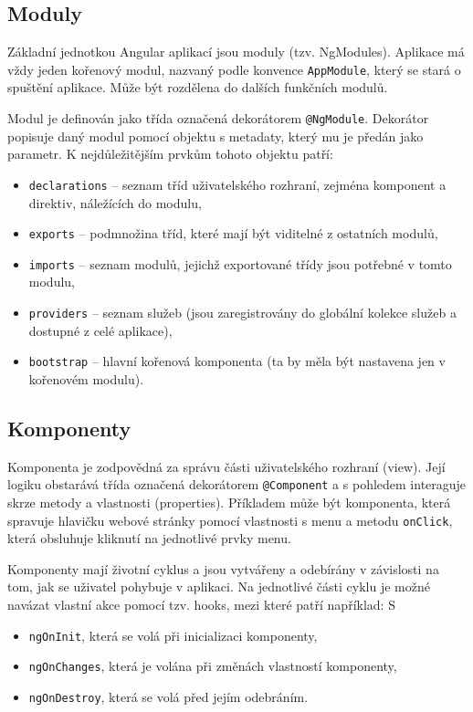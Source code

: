 \documentclass[
  digital, %
  oneside, %
  table,   %
  nolof,     %
  nolot,     %
]{fithesis3}
\begin{document}
\subsection{Moduly}
Základní jednotkou Angular aplikací jsou moduly (tzv. NgModules). Aplikace má vždy jeden kořenový modul, nazvaný podle konvence \verb|AppModule|, který se stará o spuštění aplikace. Může být rozdělena do dalších funkčních modulů.\par
Modul je definován jako třída označená dekorátorem \verb|@NgModule|. Dekorátor popisuje daný modul pomocí objektu s metadaty, který mu je předán jako parametr. K nejdůležitějším prvkům tohoto objektu patří: \cite{angulario}
\begin{itemize}
  \item \verb|declarations| – seznam tříd uživatelského rozhraní, zejména komponent a direktiv, náležících do modulu,
  \item \verb|exports| – podmnožina tříd, které mají být viditelné z ostatních modulů,
  \item \verb|imports| – seznam modulů, jejichž exportované třídy jsou potřebné v tomto modulu,
  \item \verb|providers| – seznam služeb (jsou zaregistrovány do globální kolekce služeb a dostupné z celé aplikace),
  \item \verb|bootstrap| – hlavní kořenová komponenta (ta by měla být nastavena jen v kořenovém modulu).
\end{itemize}

\subsection{Komponenty}
Komponenta je zodpovědná za správu části uživatelského rozhraní (view). Její logiku obstarává třída označená dekorátorem \verb|@Component| a s pohledem interaguje skrze metody a vlastnosti (properties). Příkladem může být komponenta, která spravuje hlavičku webové stránky pomocí vlastnosti s menu a metodu \verb|onClick|, která obsluhuje kliknutí na jednotlivé prvky menu.\par
Komponenty mají životní cyklus a jsou vytvářeny a odebírány v závislosti na tom, jak se uživatel pohybuje v aplikaci. Na jednotlivé části cyklu je možné navázat vlastní akce pomocí tzv. hooks, mezi které patří například: \cite{angulario}S
\begin{itemize}
  \item \verb|ngOnInit|, která se volá při inicializaci komponenty,
  \item \verb|ngOnChanges|, která je volána při změnách vlastností komponenty,
  \item \verb|ngOnDestroy|, která se volá před jejím odebráním.
\end{itemize}
\end{document}
